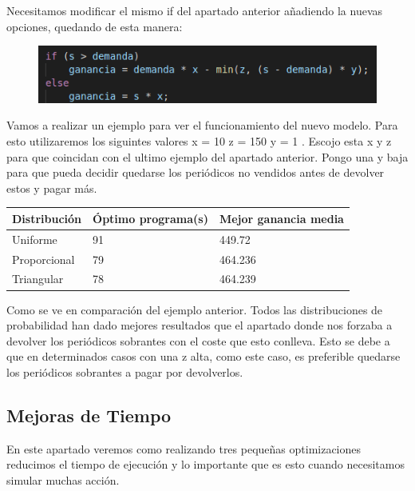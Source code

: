 \documentclass[]{article}
\begin{document}
Necesitamos modificar el mismo if del apartado anterior añadiendo la nuevas opciones, quedando de esta manera:

\begin{figure}[H]
	\centering
	\includegraphics[width=1\linewidth]{img/screenshot006}
	\label{fig:screenshot006}
\end{figure}


Vamos a realizar un ejemplo para ver el funcionamiento del nuevo modelo. 
Para esto utilizaremos los siguintes valores {x = 10 z = 150 y = 1 }. Escojo esta x y z para que coincidan con el ultimo ejemplo del apartado anterior. Pongo una y baja para que pueda decidir quedarse los periódicos no vendidos antes de devolver estos y pagar más.  
	\begin{table}[H]
		\begin{center}
			\begin{tabular}{|l|l|l|}
				
				\hline
				Distribución & Óptimo programa(s) & Mejor ganancia media\\
				\hline \hline
				Uniforme &  91 &  449.72
				\\ \hline
				Proporcional & 79  & 464.236
				\\ \hline
				Triangular & 78  & 464.239
				\\ \hline
				
			\end{tabular}
			
			\label{tabla:sencilla}
		\end{center}
	\end{table}
	
Como se ve en comparación del ejemplo anterior. Todos las distribuciones de probabilidad han dado mejores resultados que el apartado donde nos forzaba a devolver los periódicos sobrantes con el coste que esto conlleva. Esto se debe a que en determinados casos con una z alta, como este caso, es preferible quedarse los periódicos sobrantes a pagar por devolverlos.
\newpage
\subsection{Mejoras de Tiempo}
En este apartado veremos como realizando tres pequeñas optimizaciones reducimos el tiempo de ejecución y lo importante que es esto cuando necesitamos simular muchas acción.
\end{document}
